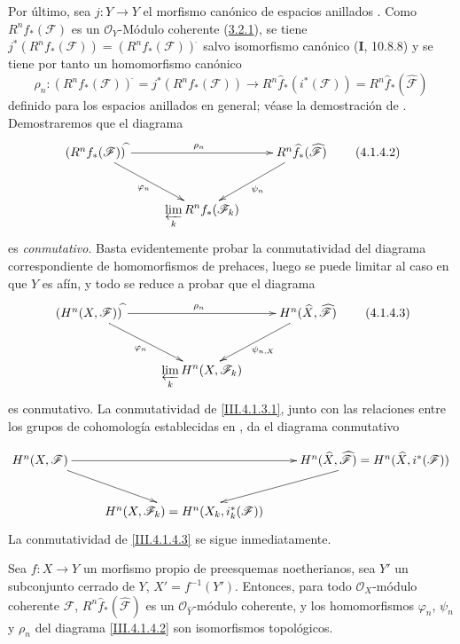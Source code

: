 \begin{env}[4.1.4]
\label{III.4.1.4}
\label{III.4.1.4-fr}
Por último, sea $j:\widehat Y\to Y$ el morfismo canónico de espacios
anillados .
Como $R^nf_*(\mathcal F)$ es un $\mathcal O_Y$-Módulo coherente (\hyperref[III.3.2.1-fr]{3.2.1}), se tiene $j^*(R^nf_*(\mathcal F))=(R^nf_*(\mathcal F))^{\widehat{\,}}$ salvo isomorfismo canónico (\textbf{I}, 10.8.8) y se tiene por tanto un homomorfismo canónico \[
\rho_n:(R^nf_*(\mathcal F))^{\widehat{\,}}=j^*(R^nf_*(\mathcal F))
\longrightarrow R^n\widehat f_*(i^*(\mathcal F))
=R^n\widehat f_*(\widehat{\mathcal F})
\tag{4.1.4.1}\label{III.4.1.4.1-fr}
\]
definido para los espacios anillados en general; véase la demostración
de .
Demostraremos que el diagrama
\[
\xymatrix{
(R^nf_*(\mathcal F))^{\widehat{\,}}\ar[rr]^{\rho_n}\ar[dr]_{\varphi_n}
&&R^n\widehat f_*(\widehat{\mathcal F})\ar[dl]^{\psi_n}\\
&\displaystyle\varprojlim_kR^nf_*(\mathcal F_k)&
}
\tag{4.1.4.2}\label{III.4.1.4.2-fr}
\] es \emph{conmutativo}. Basta evidentemente probar la conmutatividad del diagrama correspondiente de homomorfismos de prehaces, luego se puede limitar al caso en que $Y$ es afín, y todo se reduce a probar que el diagrama \[
\xymatrix{
(H^n(X,\mathcal F))^{\widehat{\,}}\ar[rr]^{\rho_n}\ar[dr]_{\varphi_n}
&&H^n(\widehat X,\widehat{\mathcal F})\ar[dl]^{\psi_{n,X}}\\
&\displaystyle\varprojlim_kH^n(X,\mathcal F_k)&
}
\tag{4.1.4.3}\label{III.4.1.4.3-fr}
\]
es conmutativo.
La conmutatividad de \eqref{III.4.1.3.1}, junto con las relaciones
entre los grupos de cohomología establecidas en , da
el diagrama conmutativo


\[
\xymatrix{
H^n(X,\mathcal F)\ar[rr]\ar[dr]&&
H^n(\widehat X,\widehat{\mathcal F})
=H^n(\widehat X,i^*(\mathcal F))\ar[dl]\\
&H^n(X,\mathcal F_k)=H^n(X_k,i_k^*(\mathcal F))&
}
\]
La conmutatividad de \eqref{III.4.1.4.3} se sigue inmediatamente.
\end{env}

\begin{theorem}[4.1.5]
\label{III.4.1.5}
\label{III.4.1.5-fr}
Sea $f:X\to Y$ un morfismo propio de preesquemas noetherianos, sea
$Y'$ un subconjunto cerrado de $Y$, $X'=f^{-1}(Y')$.
Entonces, para todo $\mathcal O_X$-módulo coherente $\mathcal F$,
$R^n\widehat f_*(\widehat{\mathcal F})$
es un $\mathcal O_{\widehat Y}$-módulo coherente, y los homomorfismos
$\varphi_n$, $\psi_n$ y $\rho_n$ del diagrama
\eqref{III.4.1.4.2} son isomorfismos topológicos.
\end{theorem}

